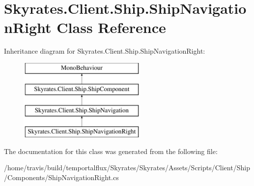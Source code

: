 \hypertarget{class_skyrates_1_1_client_1_1_ship_1_1_ship_navigation_right}{\section{Skyrates.\-Client.\-Ship.\-Ship\-Navigation\-Right Class Reference}
\label{class_skyrates_1_1_client_1_1_ship_1_1_ship_navigation_right}
}
Inheritance diagram for Skyrates.\-Client.\-Ship.\-Ship\-Navigation\-Right\-:\begin{figure}[H]
\begin{center}
\leavevmode
\includegraphics[height=4.000000cm]{class_skyrates_1_1_client_1_1_ship_1_1_ship_navigation_right}
\end{center}
\end{figure}


The documentation for this class was generated from the following file\-:\begin{DoxyCompactItemize}
\item 
/home/travis/build/temportalflux/\-Skyrates/\-Skyrates/\-Assets/\-Scripts/\-Client/\-Ship/\-Components/Ship\-Navigation\-Right.\-cs\end{DoxyCompactItemize}
